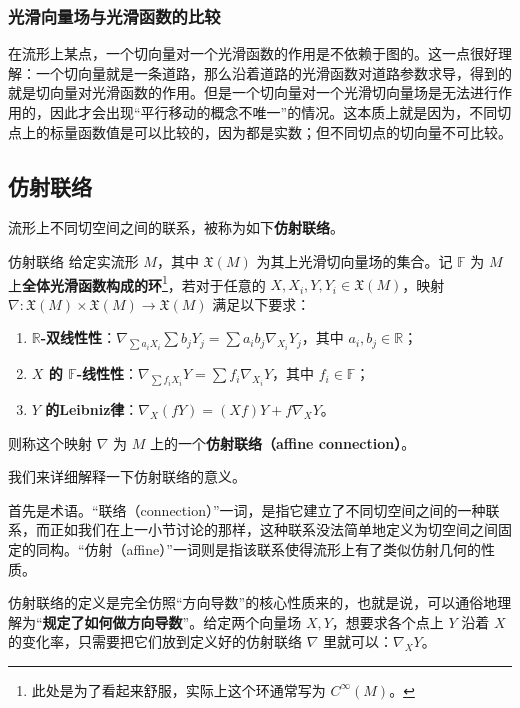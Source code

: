 \subsubsection{光滑向量场与光滑函数的比较}

在流形上某点，一个切向量对一个光滑函数的作用是不依赖于图的。这一点很好理解：一个切向量就是一条道路，那么沿着道路的光滑函数对道路参数求导，得到的就是切向量对光滑函数的作用。但是一个切向量对一个光滑切向量场是无法进行作用的，因此才会出现“平行移动的概念不唯一”的情况。这本质上就是因为，不同切点上的标量函数值是可以比较的，因为都是实数；但不同切点的切向量不可比较。


\subsection{仿射联络}

流形上不同切空间之间的联系，被称为如下\textbf{仿射联络}。

\begin{definition}{仿射联络}
给定实流形 $M$，其中 $\mathfrak{X}(M)$ 为其上光滑切向量场的集合。记 $\mathbb{F}$ 为 $M$ 上\textbf{全体光滑函数构成的环}\footnote{此处是为了看起来舒服，实际上这个环通常写为 $C^\infty(M)$。}，若对于任意的 $X, X_i, Y, Y_i\in\mathfrak{X}(M)$，映射 $\nabla:\mathfrak{X}(M)\times\mathfrak{X}(M)\to\mathfrak{X}(M)$ 满足以下要求：
\begin{enumerate}
\item \textbf{$\mathbb{R}$-双线性性}：$\nabla_{\sum a_iX_i}\sum b_jY_j=\sum a_ib_j\nabla_{X_i}Y_j$，其中 $a_i, b_j\in\mathbb{R}$；
\item \textbf{$X$ 的 $\mathbb{F}$-线性性}：$\nabla_{\sum f_iX_i}Y=\sum f_i\nabla_{X_i}Y$，其中 $f_i\in\mathbb{F}$；
\item \textbf{$Y$ 的Leibniz律}：$\nabla_X(fY)=(Xf)Y+f\nabla_XY$。
\end{enumerate}
则称这个映射 $\nabla$ 为 $M$ 上的一个\textbf{仿射联络（affine connection）}。
\end{definition}

我们来详细解释一下仿射联络的意义。

首先是术语。“联络（connection）”一词，是指它建立了不同切空间之间的一种联系，而正如我们在上一小节讨论的那样，这种联系没法简单地定义为切空间之间固定的同构。“仿射（affine）”一词则是指该联系使得流形上有了类似仿射几何的性质。

仿射联络的定义是完全仿照“方向导数”的核心性质来的，也就是说，可以通俗地理解为“\textbf{规定了如何做方向导数}”。给定两个向量场 $X, Y$，想要求各个点上 $Y$ 沿着 $X$ 的变化率，只需要把它们放到定义好的仿射联络 $\nabla$ 里就可以：$\nabla_XY$。

